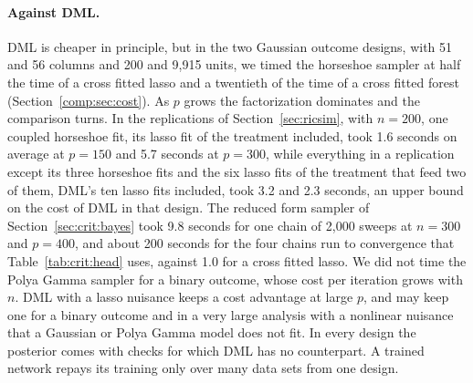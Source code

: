 \paragraph{Against DML.} DML is cheaper in principle, but in the two Gaussian outcome designs, with 51 and 56 columns and 200 and 9,915 units, we timed the horseshoe sampler at half the time of a cross fitted lasso and a twentieth of the time of a cross fitted forest (Section~\ref{comp:sec:cost}). As $p$ grows the factorization dominates and the comparison turns. In the replications of Section~\ref{sec:ricsim}, with $n = 200$, one coupled horseshoe fit, its lasso fit of the treatment included, took 1.6 seconds on average at $p = 150$ and 5.7 seconds at $p = 300$, while everything in a replication except its three horseshoe fits and the six lasso fits of the treatment that feed two of them, DML's ten lasso fits included, took 3.2 and 2.3 seconds, an upper bound on the cost of DML in that design. The reduced form sampler of Section~\ref{sec:crit:bayes} took 9.8 seconds for one chain of 2,000 sweeps at $n = 300$ and $p = 400$, and about 200 seconds for the four chains run to convergence that Table~\ref{tab:crit:head} uses, against 1.0 for a cross fitted lasso. We did not time the Polya Gamma sampler for a binary outcome, whose cost per iteration grows with $n$. DML with a lasso nuisance keeps a cost advantage at large $p$, and may keep one for a binary outcome and in a very large analysis with a nonlinear nuisance that a Gaussian or Polya Gamma model does not fit. In every design the posterior comes with checks for which DML has no counterpart. A trained network repays its training only over many data sets from one design.
